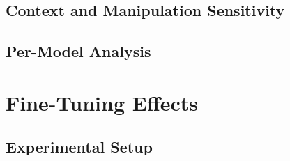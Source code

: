 
\subsection{Context and Manipulation Sensitivity}
\label{sec:ctx_manipulation}


\subsection{Per-Model Analysis}
\label{sec:ctx_per_model}



\section{Fine-Tuning Effects}
\label{sec:fine_tuning}


\subsection{Experimental Setup}
\label{sec:ft_setup}


